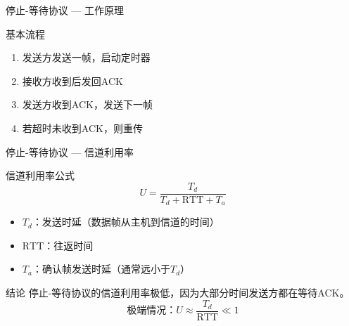 \documentclass[10pt, aspectratio=169]{beamer}
\begin{document}
\begin{frame}{停止-等待协议 --- 工作原理}
    \begin{center}
    \end{center}
    \vspace{0.5em}
    \begin{block}{基本流程}
        \begin{enumerate}
            \item 发送方发送一帧，启动定时器
            \item 接收方收到后发回ACK
            \item 发送方收到ACK，发送下一帧
            \item 若超时未收到ACK，则重传
        \end{enumerate}
    \end{block}
\end{frame}

\begin{frame}{停止-等待协议 --- 信道利用率}
    \begin{block}{信道利用率公式}
        \[
        U = \frac{T_d}{T_d + \text{RTT} + T_a}
        \]
        \begin{itemize}
            \item $T_d$：发送时延（数据帧从主机到信道的时间）
            \item $\text{RTT}$：往返时间
            \item $T_a$：确认帧发送时延（通常远小于$T_d$）
        \end{itemize}
    \end{block}
    \vspace{0.5em}
    \begin{alertblock}{结论}
        停止-等待协议的信道利用率极低，因为大部分时间发送方都在等待ACK。
        \[
        \text{极端情况：} U \approx \frac{T_d}{\text{RTT}} \ll 1
        \]
    \end{alertblock}
\end{frame}
\end{document}
